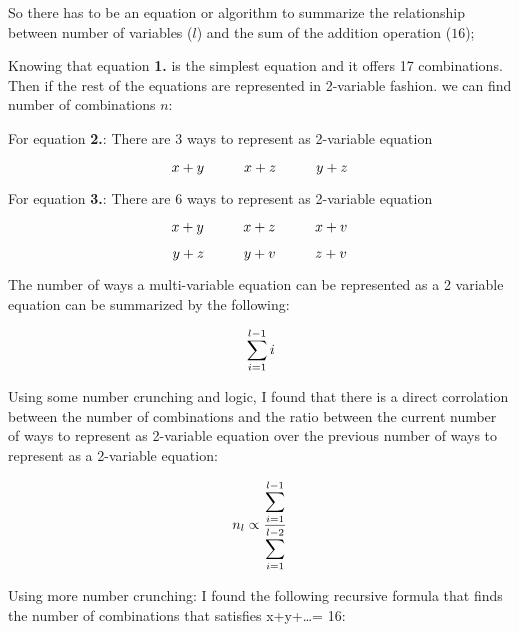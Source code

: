 \documentclass[fleqn, a4paper,12pt]{article}
\begin{document}
So there has to be an equation or algorithm to summarize the relationship between number of variables ($l$) and the sum of the addition operation ($16$);

Knowing that equation \textbf{1.} is the simplest equation and it offers 17 combinations. Then if the rest of the equations are represented in 2-variable fashion. we can find number of combinations $n$:

For equation \textbf{2.}: There are 3 ways to represent as 2-variable equation
\begin{center}
\[
\hspace*{\fill} x + y \hspace{1cm} x + z \hspace{1cm} y + z \hspace*{\fill}
\]
\end{center}

For equation \textbf{3.}: There are 6 ways to represent as 2-variable equation
\begin{center}
\[
\hspace*{\fill} x + y \hspace{1cm} x + z \hspace{1cm} x + v \hspace*{\fill}
\]
\end{center}
\begin{center}
\[
\hspace*{\fill} y + z \hspace{1cm} y + v \hspace{1cm} z + v \hspace*{\fill}
\]
\end{center}

The number of ways a multi-variable equation can be represented as a 2 variable equation can be summarized by the following:

\[
\\ \sum_{i=1}^{l-1} i
\]

Using some number crunching and logic, I found that there is a direct corrolation between the number of combinations and the ratio between the current number of ways to represent as 2-variable equation over the previous number of ways to represent as a 2-variable equation:

\[
		\\ n_l \propto \frac{\displaystyle \sum_{i=1}^{l-1}}{\displaystyle \sum_{i=1}^{l-2}}
\]

Using more number crunching: I found the following recursive formula that finds the number of combinations that satisfies x+y+\dots = 16:
\end{document}
